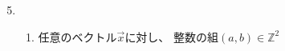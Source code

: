 \documentclass[12pt,b5paper]{ltjsarticle}
\begin{document}
\begin{enumerate}\setcounter{enumi}{4}
 \item
      \begin{enumerate}\renewcommand{\theenumii}{\roman{enumii}}
       \item
            任意のベクトル$\vec{x}$に対し、
            整数の組$(a,b)\in\mathbb{Z}^2$
            
            
      \end{enumerate}
\end{enumerate}
\end{document}
